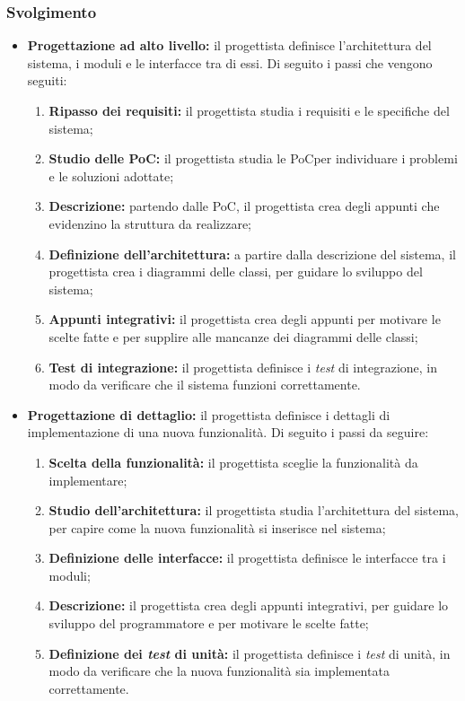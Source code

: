 \subsubsection*{Svolgimento}
\begin{itemize}
	\item \textbf{Progettazione ad alto livello:} il progettista definisce l'architettura del sistema, i moduli e le interfacce tra di essi. 
		Di seguito i passi che vengono seguiti:
		\begin{enumerate}
			\item \textbf{Ripasso dei requisiti:} il progettista studia i requisiti e le specifiche del sistema;
			\item \textbf{Studio delle PoC\g:} il progettista studia le PoC\g per individuare i problemi e le soluzioni adottate;
			\item \textbf{Descrizione:} partendo dalle PoC\g, il progettista crea degli appunti che evidenzino la struttura da realizzare;
			\item \textbf{Definizione dell'architettura:} a partire dalla descrizione del sistema, il progettista crea i diagrammi delle classi, per guidare lo sviluppo del sistema;
			\item \textbf{Appunti integrativi:} il progettista crea degli appunti per motivare le scelte fatte e per supplire alle mancanze dei diagrammi delle classi;
			\item \textbf{Test di integrazione:} il progettista definisce i \textit{test} di integrazione, in modo da verificare che il sistema funzioni correttamente.
		\end{enumerate}
	\item \textbf{Progettazione di dettaglio:} il progettista definisce i dettagli di implementazione di una nuova funzionalità. 
		Di seguito i passi da seguire:
		\begin{enumerate}
			\item \textbf{Scelta della funzionalità:} il progettista sceglie la funzionalità da implementare;
			\item \textbf{Studio dell'architettura:} il progettista studia l'architettura del sistema, per capire come la nuova funzionalità si inserisce nel sistema;
			\item \textbf{Definizione delle interfacce:} il progettista definisce le interfacce tra i moduli;
			\item \textbf{Descrizione:} il progettista crea degli appunti integrativi, per guidare lo sviluppo del programmatore e per motivare le scelte fatte;
			\item \textbf{Definizione dei \textit{test} di unità:} il progettista definisce i \textit{test} di unità, in modo da verificare che la nuova funzionalità sia implementata correttamente.
		\end{enumerate}
\end{itemize}

